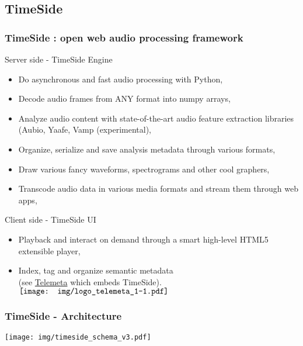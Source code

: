 \documentclass[10pt, final, hyperref, table]{beamer}
\begin{document}
\subsection{TimeSide}
\begin{frame}
 \frametitle{TimeSide : open web audio processing framework}%
\begin{block}{Server side - TimeSide Engine}
  \begin{itemize}
  \item \alert{Do} asynchronous and fast audio processing with Python,
  \item \alert{Decode} audio frames from ANY format into numpy arrays,
  \item \alert{Analyze} audio content with state-of-the-art audio feature extraction libraries (Aubio, Yaafe, Vamp (experimental),
  \item  \alert{Organize}, serialize and save analysis metadata through various formats,
  \item  \alert{Draw} various fancy waveforms, spectrograms and other cool graphers,
  \item  \alert{Transcode} audio data in various media formats and stream them through web apps,
  \end{itemize}
 
\end{block}
\begin{block}{Client side - TimeSide UI}
  \begin{itemize}
  \item   \alert{Playback} and  \alert{interact} on demand through a smart high-level HTML5 extensible player,
  \item   \alert{Index},  \alert{tag} and  \alert{organize semantic metadata} \\
(see \href{http://telemeta.org/}{Telemeta} which embeds TimeSide). 
\hfill $\vcenter{\hbox{\texttt{[image: img/logo\_telemeta\_1-1.pdf]}}}$
  \end{itemize}
\end{block}
\end{frame}

\begin{frame}
  \frametitle{TimeSide - Architecture}
  \begin{center}
    \texttt{[image: img/timeside\_schema\_v3.pdf]}
  \end{center}
\end{frame}
\end{document}
